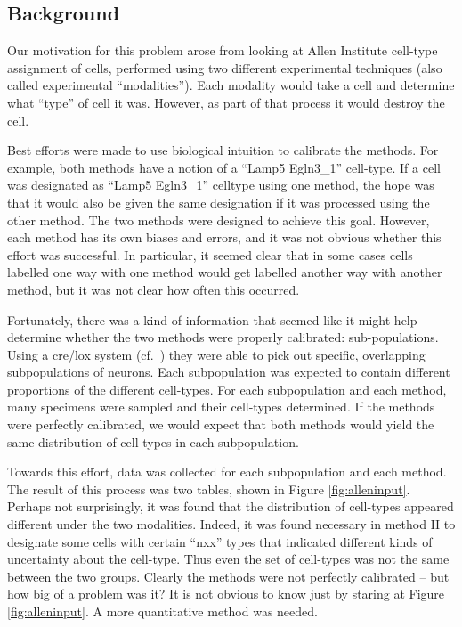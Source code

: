\subsection{Background}

Our motivation for this problem arose from looking at Allen Institute cell-type assignment of cells, performed using two different experimental techniques (also called experimental ``modalities'').  Each modality would take a cell and determine what ``type'' of cell it was.  However, as part of that process it would destroy the cell.

Best efforts were made to use biological intuition to calibrate the methods.  For example, both methods have a notion of a ``Lamp5 Egln3\_1'' cell-type.  If a cell was designated as ``Lamp5 Egln3\_1'' celltype using one method, the hope was that it would also be given the same designation if it was processed using the other method.  The two methods were designed to achieve this goal.  However, each method has its own biases and errors, and it was not obvious whether this effort was successful.  In particular, it seemed clear that in some cases cells labelled one way with one method would get labelled another way with another method, but it was not clear how often this occurred.  

Fortunately, there was a kind of information that seemed like it might help determine whether the two methods were properly calibrated: sub-populations.  Using a cre/lox system (cf.\ \citep{tasic2017shared}) they were able to pick out specific, overlapping subpopulations of neurons.  Each subpopulation was expected to contain different proportions of the different cell-types.  For each subpopulation and each method, many specimens were sampled and their cell-types determined.  If the methods were perfectly calibrated, we would expect that both methods would yield the same distribution of cell-types in each subpopulation.  

Towards this effort, data was collected for each subpopulation and each method.  The result of this process was two tables, shown in Figure \ref{fig:alleninput}.  Perhaps not surprisingly, it was found that the distribution of cell-types appeared different under the two modalities.  Indeed, it was found necessary in method II to designate some cells with certain ``nxx'' types that indicated different kinds of uncertainty about the cell-type.  Thus even the set of cell-types was not the same between the two groups.  Clearly the methods were not perfectly calibrated -- but how big of a problem was it?  It is not obvious to know just by staring at Figure \ref{fig:alleninput}.  A more quantitative method was needed.  

